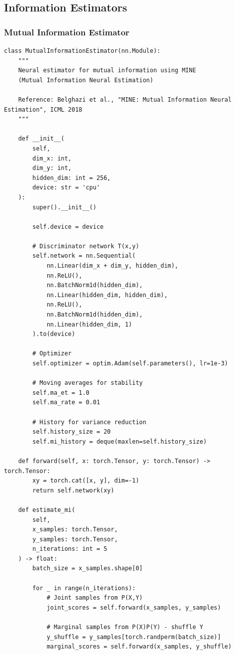 \documentclass[10pt, letterpaper]{article}
\begin{document}
\subsection{Information Estimators}

\subsubsection{Mutual Information Estimator}

\begin{lstlisting}
class MutualInformationEstimator(nn.Module):
    """
    Neural estimator for mutual information using MINE
    (Mutual Information Neural Estimation)

    Reference: Belghazi et al., "MINE: Mutual Information Neural Estimation", ICML 2018
    """

    def __init__(
        self,
        dim_x: int,
        dim_y: int,
        hidden_dim: int = 256,
        device: str = 'cpu'
    ):
        super().__init__()

        self.device = device

        # Discriminator network T(x,y)
        self.network = nn.Sequential(
            nn.Linear(dim_x + dim_y, hidden_dim),
            nn.ReLU(),
            nn.BatchNorm1d(hidden_dim),
            nn.Linear(hidden_dim, hidden_dim),
            nn.ReLU(),
            nn.BatchNorm1d(hidden_dim),
            nn.Linear(hidden_dim, 1)
        ).to(device)

        # Optimizer
        self.optimizer = optim.Adam(self.parameters(), lr=1e-3)

        # Moving averages for stability
        self.ma_et = 1.0
        self.ma_rate = 0.01

        # History for variance reduction
        self.history_size = 20
        self.mi_history = deque(maxlen=self.history_size)

    def forward(self, x: torch.Tensor, y: torch.Tensor) -> torch.Tensor:
        xy = torch.cat([x, y], dim=-1)
        return self.network(xy)

    def estimate_mi(
        self,
        x_samples: torch.Tensor,
        y_samples: torch.Tensor,
        n_iterations: int = 5
    ) -> float:
        batch_size = x_samples.shape[0]

        for _ in range(n_iterations):
            # Joint samples from P(X,Y)
            joint_scores = self.forward(x_samples, y_samples)

            # Marginal samples from P(X)P(Y) - shuffle Y
            y_shuffle = y_samples[torch.randperm(batch_size)]
            marginal_scores = self.forward(x_samples, y_shuffle)


\end{lstlisting}
\end{document}
